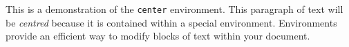 \documentclass{article}
\begin{document}
	\begin{center}
		This is a demonstration of the \texttt{center} environment. 
		This paragraph of text will be \textit{centred} because it is 
		contained within a special environment. Environments provide 
		an efficient way to modify blocks of text within your document. 
	\end{center}
\end{document}

